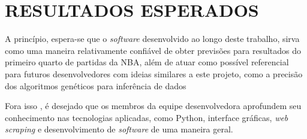 \documentclass[brazilian]{ifsc-tcc}
\begin{document}
\chapter{RESULTADOS ESPERADOS}
A princípio, espera-se que o \textit{software} desenvolvido ao longo deste trabalho, sirva como uma maneira relativamente confiável de obter previsões para resultados do primeiro quarto de partidas da NBA, além de atuar como possível referencial para futuros desenvolvedores com ideias similares a este projeto, como a precisão dos algoritmos genéticos para inferência de dados

Fora isso , é desejado que os membros da equipe desenvolvedora aprofundem seu conhecimento nas tecnologias aplicadas, como Python, interface gráficas, \textit{web scraping} e desenvolvimento de \textit{software} de uma maneira geral.











\end{document}
